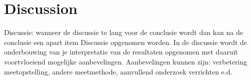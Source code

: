 \chapter{Discussion}

Discussie: wanneer de discussie te lang voor de conclusie wordt dan kan na de conclusie een apart item Discussie opgenomen worden. In de discussie wordt de onderbouwing van je interpretatie van de resultaten opgenomen met daaruit voortvloeiend mogelijke aanbevelingen. Aanbevelingen kunnen zijn: verbetering meetopstelling, andere meetmethode, aanvullend onderzoek verrichten e.d.